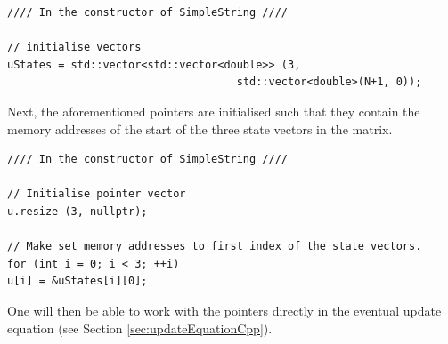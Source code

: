 \setlstCpp
\begin{lstlisting}[belowskip=-0.5\baselineskip]
//// In the constructor of SimpleString ////

// initialise vectors
uStates = std::vector<std::vector<double>> (3, 
                                    std::vector<double>(N+1, 0));
\end{lstlisting}
%
Next, the aforementioned pointers are initialised such that they contain the memory addresses of the start of the three state vectors in the matrix.
\\
\noindent
\begin{minipage}{\textwidth}
\begin{lstlisting}[belowskip=-0.5\baselineskip]
//// In the constructor of SimpleString ////

// Initialise pointer vector
u.resize (3, nullptr);

// Make set memory addresses to first index of the state vectors.
for (int i = 0; i < 3; ++i)
u[i] = &uStates[i][0];
\end{lstlisting}
\end{minipage}
One will then be able to work with the pointers directly in the eventual update equation (see Section \ref{sec:updateEquationCpp}).
    
